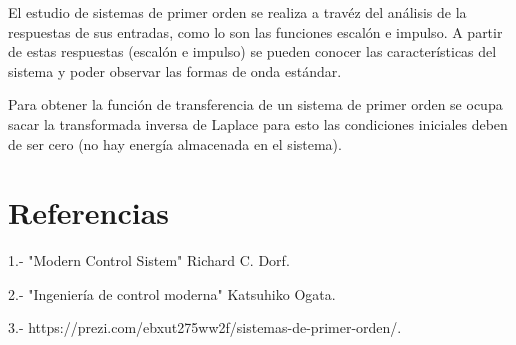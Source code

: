 \documentclass[12pt]{article}
\begin{document}
El estudio de sistemas de primer orden se realiza a travéz del análisis de la respuestas de sus entradas, como lo son las funciones escalón e impulso. A partir de estas respuestas (escalón e impulso) se pueden conocer las características del sistema y poder observar las formas de onda estándar.

Para obtener la función de transferencia de un sistema de primer orden se ocupa sacar la transformada inversa de Laplace para esto las condiciones iniciales deben de ser cero (no hay energía almacenada en el sistema).


\section{Referencias}
1.- "Modern Control Sistem" Richard C. Dorf.

2.- "Ingeniería de control moderna" Katsuhiko Ogata.

3.-  https://prezi.com/ebxut275ww2f/sistemas-de-primer-orden/.
\end{document}
